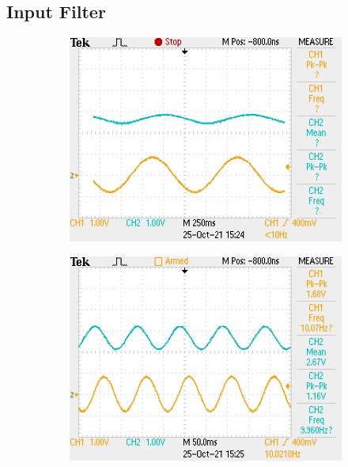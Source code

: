 \documentclass[11pt]{article}
\begin{document}
{\subsection*{Input Filter}
\begin{figure}[h!]
  \centering
  \begin{subfigure}{0.3\textwidth}
    \includegraphics[width=\columnwidth]{img/testing/input_filter/input_1Hz.JPG}
  \end{subfigure}
  \begin{subfigure}{0.3\textwidth}
    \includegraphics[width=\columnwidth]{img/testing/input_filter/input_10Hz.JPG}
  \end{subfigure}
  \begin{subfigure}{0.3\textwidth}

\end{subfigure}
\end{figure}}
\end{document}
